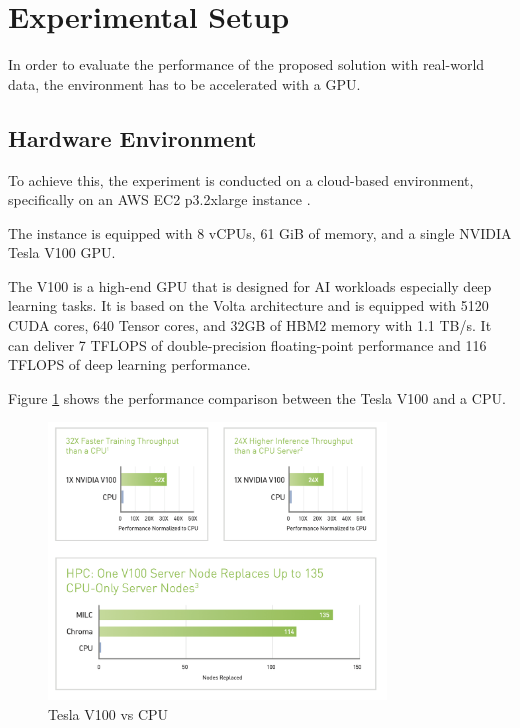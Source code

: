 \section{Experimental Setup}

In order to evaluate the performance of the proposed solution with real-world data, the environment has to be accelerated with a GPU.

\subsection{Hardware Environment}

To achieve this, the experiment is conducted on a cloud-based environment, specifically on an AWS EC2 p3.2xlarge instance \cite{AwsEc2P3}.

The instance is equipped with 8 vCPUs, 61 GiB of memory, and a single NVIDIA Tesla V100 GPU.

The V100 is a high-end GPU that is designed for AI workloads especially deep learning tasks.
It is based on the Volta architecture and is equipped with 5120 CUDA cores, 640 Tensor cores, and 32GB of HBM2 memory with 1.1 TB/s.
It can deliver 7 TFLOPS of double-precision floating-point performance and 116 TFLOPS of deep learning performance.

Figure \ref{fig:V100vsCPU} shows the performance comparison between the Tesla V100 and a CPU.


\begin{figure}[H]
    \centering
    \includegraphics[width=0.8\textwidth]{assets/v100-vs-cpu.png}
    \caption[Tesla V100 vs CPU]{Tesla V100 vs CPU \cite{NvidiaV100DataSheet}}
    \label{fig:V100vsCPU}
\end{figure}

